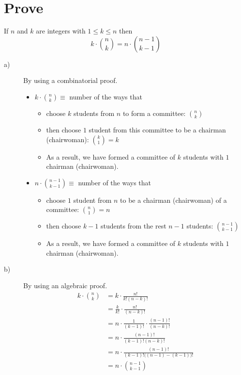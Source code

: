 \documentclass[a4paper]{article}
\begin{document}
\section*{Prove}
If $n$ and $k$ are integers with $1\leq k \leq n$ then
$$
k\cdot \binom{n}{k}=n\cdot \binom{n-1}{k-1}
$$
\begin{description}
\item [a)]{By using a combinatorial proof.}
\begin{itemize}
    \item $k\cdot \binom{n}{k}\equiv$ number of the ways that 
        \begin{itemize}
            \item choose $k$ students from $n$ to form a committee: $\binom{n}{k}$
            \item then choose $1$ student from this committee to be a chairman (chairwoman): $\binom{k}{1}=k$
            \item As a result, we have formed a committee of $k$ students with $1$ chairman (chairwoman).
        \end{itemize}
    \item $n\cdot \binom{n-1}{k-1}\equiv$ number of the ways that 
        \begin{itemize}
            \item choose $1$ student from $n$ to be a chairman (chairwoman) of a committee: $\binom{n}{1}=n$
            \item then choose $k-1$ students from the rest $n-1$ students: $\binom{n-1}{k-1}$
            \item As a result, we have formed a committee of $k$ students with $1$ chairman (chairwoman).
        \end{itemize}
\end{itemize}

\item [b)]{By using an algebraic proof.}
\begin{align*}
    k\cdot \binom{n}{k} & = k\cdot \frac{n!}{k!(n-k)!}\\
    & = \frac{k}{k!}\cdot \frac{n!}{(n-k)!}\\
    & = n \cdot \frac{1}{(k-1)!}\cdot \frac{(n-1)!}{(n-k)!}\\
    & = n \cdot \frac{(n-1)!}{(k-1)!(n-k)!}\\
    & = n \cdot \frac{(n-1)!}{(k-1)!\bigl((n-1)-(k-1)\bigr)!}\\
    & = n\cdot \binom{n-1}{k-1}\\
\end{align*}
\end{description}
\end{document}
